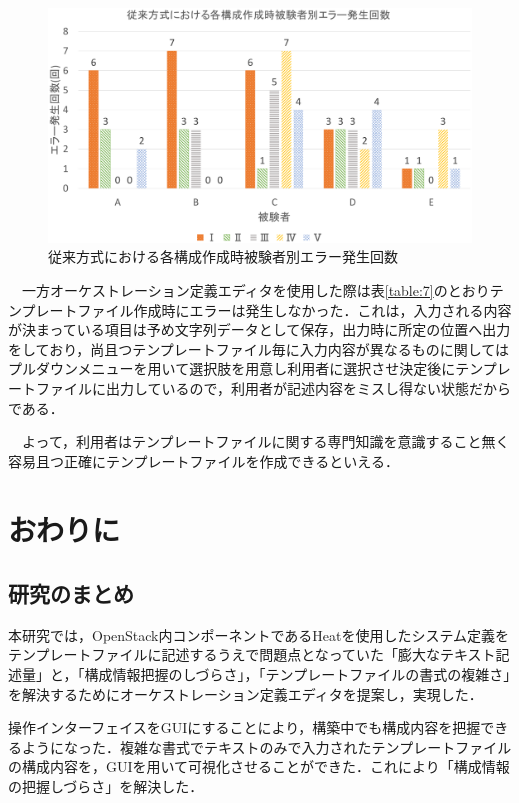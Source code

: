 \documentclass[mingoth]{kut-paper}		%
\begin{document}
		\begin{figure}[H]
			\begin{center}
				\includegraphics[scale=0.45]{Document/TemplateFile_ErrorGraf.eps}
				\caption{従来方式における各構成作成時被験者別エラー発生回数}
				\label{graf:6}
			\end{center}
		\end{figure}
		　一方オーケストレーション定義エディタを使用した際は表\ref{table:7}のとおりテンプレートファイル作成時にエラーは発生しなかった．これは，入力される内容が決まっている項目は予め文字列データとして保存，出力時に所定の位置へ出力をしており，尚且つテンプレートファイル毎に入力内容が異なるものに関してはプルダウンメニューを用いて選択肢を用意し利用者に選択させ決定後にテンプレートファイルに出力しているので，利用者が記述内容をミスし得ない状態だからである．
		
		　よって，利用者はテンプレートファイルに関する専門知識を意識すること無く容易且つ正確にテンプレートファイルを作成できるといえる．
\chapter{おわりに}
	\section{研究のまとめ}
	本研究では，OpenStack内コンポーネントであるHeatを使用したシステム定義をテンプレートファイルに記述するうえで問題点となっていた「膨大なテキスト記述量」と，「構成情報把握のしづらさ」，「テンプレートファイルの書式の複雑さ」を解決するためにオーケストレーション定義エディタを提案し，実現した．
	
	操作インターフェイスをGUIにすることにより，構築中でも構成内容を把握できるようになった．複雑な書式でテキストのみで入力されたテンプレートファイルの構成内容を，GUIを用いて可視化させることができた．これにより「構成情報の把握しづらさ」を解決した．
	
\end{document}
